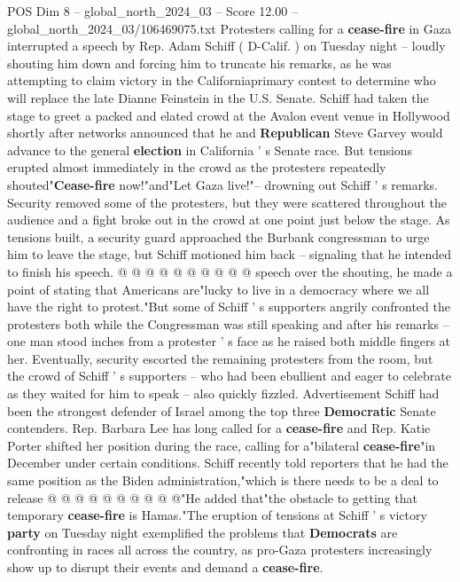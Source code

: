 \begin{textsample}{POS Dim 8 – global\_north\_2024\_03 – Score 12.00 – global\_north\_2024\_03/106469075.txt}  \label{ex:f8_pos_008}
Protesters calling for a \textbf{cease-fire} in Gaza interrupted a speech by Rep.
Adam Schiff ( D-Calif. ) on Tuesday night -- loudly shouting him down and forcing him to truncate his remarks, as he was attempting to claim victory in the Californiaprimary contest to determine who will replace the late Dianne Feinstein in the U.S.
Senate.
Schiff had taken the stage to greet a packed and elated crowd at the Avalon event venue in Hollywood shortly after networks announced that he and \textbf{Republican} Steve Garvey would advance to the general \textbf{election} in California ' s Senate race.
But tensions erupted almost immediately in the crowd as the protesters repeatedly shouted"\textbf{Cease-fire} now!"and"Let Gaza live!"-- drowning out Schiff ' s remarks.
Security removed some of the protesters, but they were scattered throughout the audience and a fight broke out in the crowd at one point just below the stage.
As tensions built, a security guard approached the Burbank congressman to urge him to leave the stage, but Schiff motioned him back -- signaling that he intended to finish his speech. @ @ @ @ @ @ @ @ @ @ speech over the shouting, he made a point of stating that Americans are"lucky to live in a democracy where we all have the right to protest."But some of Schiff ' s supporters angrily confronted the protesters both while the Congressman was still speaking and after his remarks -- one man stood inches from a protester ' s face as he raised both middle fingers at her.
Eventually, security escorted the remaining protesters from the room, but the crowd of Schiff ' s supporters -- who had been ebullient and eager to celebrate as they waited for him to speak -- also quickly fizzled.
Advertisement Schiff had been the strongest defender of Israel among the top three \textbf{Democratic} Senate contenders.
Rep.
Barbara Lee has long called for a \textbf{cease-fire} and Rep.
Katie Porter shifted her position during the race, calling for a"bilateral \textbf{cease-fire}"in December under certain conditions.
Schiff recently told reporters that he had the same position as the Biden administration,"which is there needs to be a deal to release @ @ @ @ @ @ @ @ @ @"He added that"the obstacle to getting that temporary \textbf{cease-fire} is Hamas."The eruption of tensions at Schiff ' s victory \textbf{party} on Tuesday night exemplified the problems that \textbf{Democrats} are confronting in races all across the country, as pro-Gaza protesters increasingly show up to disrupt their events and demand a \textbf{cease-fire}.

\end{textsample}
